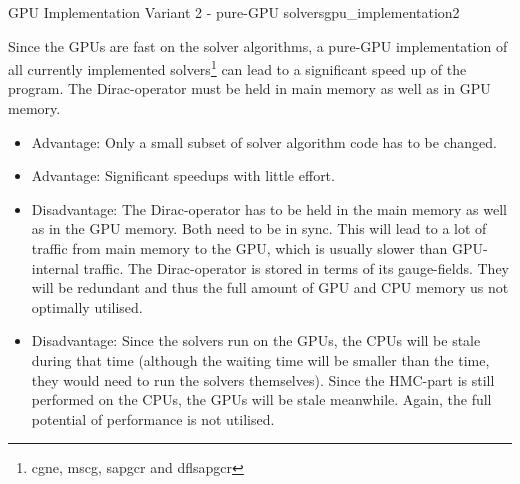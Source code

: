 \documentclass{article}
\theoremstyle{plain} %
\theoremstyle{convention} %
\theoremstyle{remark} %
\numberwithin{equation}{section}
\begin{document}
\begin{proposal}{GPU Implementation Variant 2 - pure-GPU solvers}{gpu_implementation2} %

Since the GPUs are fast on the solver algorithms, a pure-GPU implementation of all currently implemented solvers\footnote{\acrshort{cgne}, \acrshort{mscg}, \acrshort{sapgcr} and \acrshort{dflsapgcr}} can lead to a significant speed up of the program. The Dirac-operator must be held in main memory as well as in GPU memory.

\begin{itemize}
    \item Advantage: Only a small subset of solver algorithm code has to be changed.
    \item Advantage: Significant speedups with little effort.
    \item Disadvantage: The Dirac-operator has to be held in the main memory as well as in the GPU memory. Both need to be in sync. This will lead to a lot of traffic from main memory to the GPU, which is usually slower than GPU-internal traffic. The Dirac-operator is stored in terms of its gauge-fields. They will be redundant and thus the full amount of GPU and CPU memory us not optimally utilised.
    \item Disadvantage: Since the solvers run on the GPUs, the CPUs will be stale during that time (although the waiting time will be smaller than the time, they would need to run the solvers themselves). Since the HMC-part is still performed on the CPUs, the GPUs will be stale meanwhile. Again, the full potential of performance is not utilised.
\end{itemize}

\end{proposal}
\end{document}

